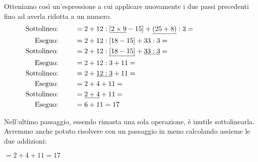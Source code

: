 Otteniamo così un'espressione a cui applicare nuovamente i due passi 
precedenti fino ad averla ridotta a un numero.
\begin{align*}
\text{Sottolineo: } \qquad &= 2 + 
 12 : \left[ \underline{2 \times 9} - 15 \right] +
 \underline{\left( 25 + 8 \right)} : 3 = \hspace{20mm}\\ 
\text{Eseguo: } \qquad &= 2 + 12 : \left[ 18 - 15 \right] +
 33 : 3 =\\ 
\text{Sottolineo: } \qquad &= 2 + 
 12 : \underline{\left[ 18 - 15 \right]} +
 \underline{33 : 3} = \\ 
\text{Eseguo: } \qquad &= 2 + 
 12 : 3 +
 11 = \\ 
\text{Sottolineo: } \qquad &= 2 + 
 \underline{12 : 3} +
 11 = \\ 
\text{Eseguo: } \qquad &= 2 + 
 4 +
 11 = \\ 
\text{Sottolineo: } \qquad &= \underline{2 +  4} + 11 = \\ 
\text{Eseguo: } \qquad &= 6 + 11 = 17
\end{align*}

Nell'ultimo passaggio, essendo rimasta una sola operazione, è inutile 
sottolinearla. Avremmo anche potuto risolvere con un passaggio in meno
calcolando assieme le due addizioni:

\(= 2 + 4 + 11 = 17\)


